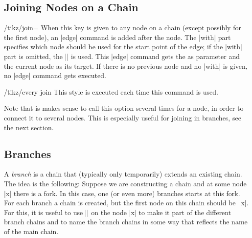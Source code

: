 \subsection{Joining Nodes on a Chain}

\begin{key}{/tikz/join=}
  When this key is given to any node on a chain (except possibly for
  the first node), an |edge| command is added after the node. The
  |with| part specifies which node should be used for the start point
  of the edge; if the |with| part is omitted, the |\tikzchainprevious|
  is used. This |edge| command gets the  as parameter
  and the current node as its target. If there is no
  previous node and no |with| is given, no |edge| command gets
  executed.  
  \begin{stylekey}{/tikz/every join}
    This style is executed each time this command is used.
  \end{stylekey}

  Note that is makes sense to call this option several times for a
  node, in order to connect it to several nodes. This is especially
  useful for joining in branches, see the next section.
\begin{codeexample}[]
\end{codeexample}
\end{key}


\subsection{Branches}

A \emph{branch} is a chain that (typically only temporarily) extends
an existing chain. The idea is the following: Suppose we are
constructing a chain and at some node |x| there is a fork. In this
case, one (or even more) branches starts at this fork. For each branch
a chain is created, but the first node on this chain should
be~|x|. For this, it is useful to use |\chainin| on the node |x| to
make it part of the different branch chains and to name the branch
chains in some way that reflects the name of the main chain.

